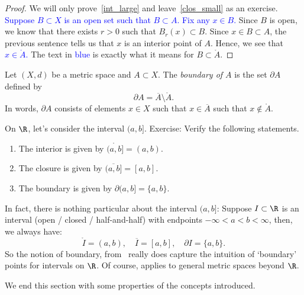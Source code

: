 \begin{proof}
	We will only prove~\ref{int_large} and leave~\ref{clos_small} as an exercise. \textcolor{blue}{Suppose $B\subset X$ is an open set such that $B\subset A$. Fix any $x\in B$.} Since $B$ is open, we know that there exists $r>0$ such that $B_r(x) \subset B$. Since $x\in B\subset A$, the previous sentence tells us that $x$ is an interior point of $A$. Hence, we see that \textcolor{blue}{$x\in \mathring{A}$.} The text in \textcolor{blue}{blue} is exactly what it means for $B\subset \mathring{A}$.
\end{proof}
\begin{defn}[Boundary]
\label{defn:boundary}
Let $(X,d)$ be a metric space and $A\subset X$. The \textit{boundary of $A$} is the set $\partial A$ defined by
\[
\partial A = \overline{A} \setminus \mathring{A}.
\]
In words, $\partial A$ consists of elements $x\in X$ such that $x\in \overline{A}$ such that $x\notin \mathring{A}$.
\end{defn}
\begin{eg}
On $\R$, let's consider the interval $(a,b]$. Exercise: Verify the following statements.
\begin{enumerate}
	\item The interior is given by $\mathring{(a,b]} = (a,b)$.
	\item The closure is given by $\overline{(a,b]} = [a,b]$.
	\item The boundary is given by $\partial(a,b] = \{a,b\}$.
\end{enumerate}
In fact, there is nothing particular about the interval $(a,b]$: Suppose $I\subset \R$ is an interval (open / closed / half-and-half) with endpoints $-\infty < a < b < \infty$, then, we always have:
\[
\mathring{I} = (a,b),\quad \overline{I} = [a,b],\quad \partial I = \{a,b\}.
\]
So the notion of boundary, from~ really does capture the intuition of `boundary' points for intervals on $\R$. Of course,  applies to general metric spaces beyond $\R$.
\end{eg}
We end this section with some properties of the concepts introduced.
